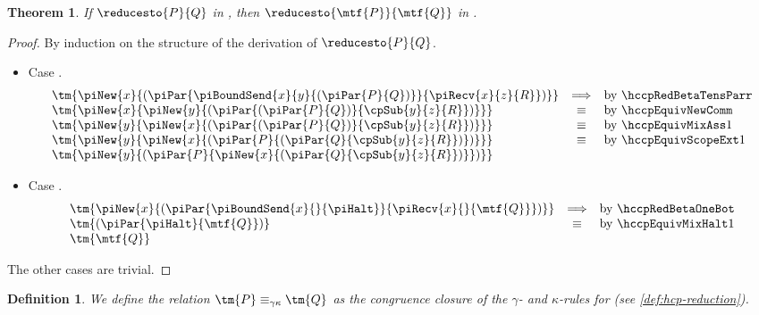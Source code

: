 \documentclass[submission,copyright,creativecommons]{eptcs}
\newtheorem{definition}{Definition}
\newtheorem{theorem}{Theorem}
\begin{document}
\begin{theorem}\label{thm:cp2hcp-reduction}
  If $\reducesto{P}{Q}$ in \cp, then $\reducesto{\mtf{P}}{\mtf{Q}}$ in \hcp.
\end{theorem}
\begin{proof}
  By induction on the structure of the derivation of $\reducesto{P}{Q}$.
  \begin{itemize}
  \item
    Case \cpRedBetaTensParr.
    \begin{gather*}
      \begin{array}{lcl}
        \tm{\piNew{x}{(\piPar{\piBoundSend{x}{y}{(\piPar{P}{Q})}}{\piRecv{x}{z}{R}})}}
        & \Longrightarrow & \text{by \hccpRedBetaTensParr}
        \\
        \tm{\piNew{x}{\piNew{y}{(\piPar{(\piPar{P}{Q})}{\cpSub{y}{z}{R}})}}}
        & \equiv & \text{by \hccpEquivNewComm}
        \\
        \tm{\piNew{y}{\piNew{x}{(\piPar{(\piPar{P}{Q})}{\cpSub{y}{z}{R}})}}}
        & \equiv & \text{by \hccpEquivMixAss1}
        \\
        \tm{\piNew{y}{\piNew{x}{(\piPar{P}{(\piPar{Q}{\cpSub{y}{z}{R}})})}}}
        & \equiv & \text{by \hccpEquivScopeExt1}
        \\
        \tm{\piNew{y}{(\piPar{P}{\piNew{x}{(\piPar{Q}{\cpSub{y}{z}{R}})}})}}
      \end{array}
    \end{gather*}
  \item
    Case \cpRedBetaOneBot.
    \begin{gather*}
      \begin{array}{lcl}
        \tm{\piNew{x}{(\piPar{\piBoundSend{x}{}{\piHalt}}{\piRecv{x}{}{\mtf{Q}}})}}
        & \Longrightarrow & \text{by \hccpRedBetaOneBot}
        \\
        \tm{(\piPar{\piHalt}{\mtf{Q}})}
        & \equiv & \text{by \hccpEquivMixHalt1}
        \\
        \tm{\mtf{Q}}
      \end{array}
    \end{gather*}
  \end{itemize}
  The other cases are trivial.
\end{proof}

\begin{definition}\label{def:hcp-kappa}
  We define the relation $\tm{P}\equiv_{\gamma\kappa}\tm{Q}$ as the congruence
  closure of the $\gamma$- and $\kappa$-rules for \hcp (see
  \cref{def:hcp-reduction}).
\end{definition}
\end{document}
